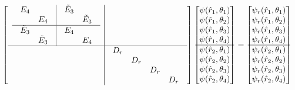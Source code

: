 \begin{align*}
 \left[
  \begin{array}{c|c}
   \begin{array}{c|c}
    \begin{array}{cc} E_4 &  \\   & E_4 \end{array}
    &
    \begin{array}{cc} \tilde{E}_3 & \\ & \tilde{E}_3 \end{array} \\ \hline
    \begin{array}{cc} \tilde{E}_3 & \\ & \tilde{E}_3 \end{array}
    &
    \begin{array}{cc} E_4 & \\ & E_4 \end{array}
   \end{array}
  & \\ \hline
  &
  \begin{array}{cccc}
   D_r &     &     & \\
       & D_r &     & \\
       &     & D_r & \\
       &     &     & D_r
  \end{array}
 \end{array}
 \right]
 \begin{bmatrix}
  \psi(\hat{r}_1,\theta_1) \\
  \psi(\hat{r}_1,\theta_2) \\
  \psi(\hat{r}_1,\theta_3) \\
  \psi(\hat{r}_1,\theta_4) \\ \hline
  \psi(\hat{r}_2,\theta_1) \\
  \psi(\hat{r}_2,\theta_2) \\
  \psi(\hat{r}_2,\theta_3) \\
  \psi(\hat{r}_2,\theta_4)
 \end{bmatrix}
 =
 \begin{bmatrix}
  \psi_r(\hat{r}_1,\theta_1) \\
  \psi_r(\hat{r}_1,\theta_2) \\
  \psi_r(\hat{r}_1,\theta_3) \\
  \psi_r(\hat{r}_1,\theta_4) \\ \hline
  \psi_r(\hat{r}_2,\theta_1) \\
  \psi_r(\hat{r}_2,\theta_2) \\
  \psi_r(\hat{r}_2,\theta_3) \\
  \psi_r(\hat{r}_2,\theta_4)
 \end{bmatrix}
\end{align*}
